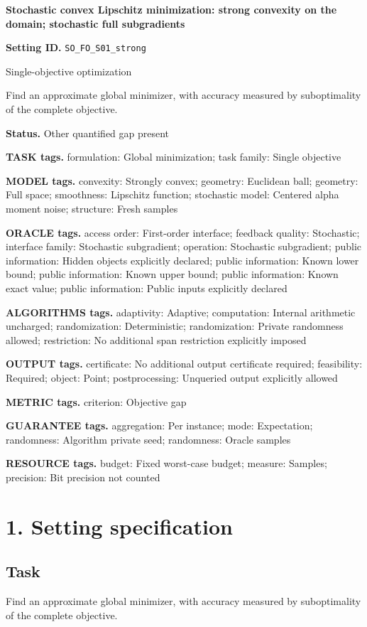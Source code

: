 \documentclass[10pt,a4paper]{article}
\begin{document}
\raggedright

{\LARGE\bfseries\sffamily\color{AtlasNavy} Stochastic convex Lipschitz minimization: strong convexity on the domain; stochastic full subgradients\par}\vspace{5pt}
\textbf{Setting ID.} \texttt{SO\_\allowbreak{}FO\_\allowbreak{}S01\_\allowbreak{}strong}

Single-objective optimization

Find an approximate global minimizer, with accuracy measured by suboptimality of the complete objective.

\textbf{Status.} Other quantified gap present

\textbf{TASK tags.} formulation: Global minimization; task family: Single objective

\textbf{MODEL tags.} convexity: Strongly convex; geometry: Euclidean ball; geometry: Full space; smoothness: Lipschitz function; stochastic model: Centered alpha moment noise; structure: Fresh samples

\textbf{ORACLE tags.} access order: First-order interface; feedback quality: Stochastic; interface family: Stochastic subgradient; operation: Stochastic subgradient; public information: Hidden objects explicitly declared; public information: Known lower bound; public information: Known upper bound; public information: Known exact value; public information: Public inputs explicitly declared

\textbf{ALGORITHMS tags.} adaptivity: Adaptive; computation: Internal arithmetic uncharged; randomization: Deterministic; randomization: Private randomness allowed; restriction: No additional span restriction explicitly imposed

\textbf{OUTPUT tags.} certificate: No additional output certificate required; feasibility: Required; object: Point; postprocessing: Unqueried output explicitly allowed

\textbf{METRIC tags.} criterion: Objective gap

\textbf{GUARANTEE tags.} aggregation: Per instance; mode: Expectation; randomness: Algorithm private seed; randomness: Oracle samples

\textbf{RESOURCE tags.} budget: Fixed worst-case budget; measure: Samples; precision: Bit precision not counted

\section{1. Setting specification}
\subsection{Task}
Find an approximate global minimizer, with accuracy measured by suboptimality of the complete objective.
\end{document}
